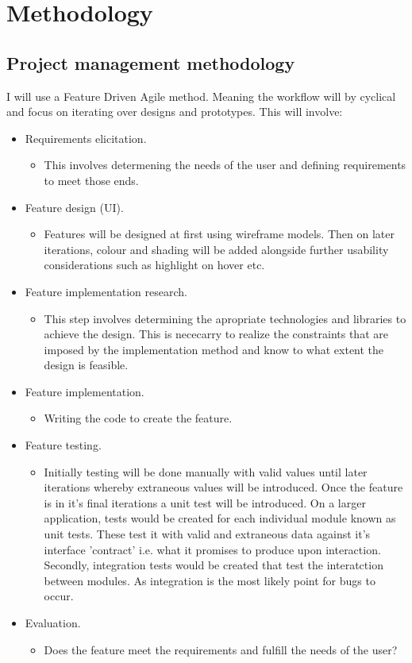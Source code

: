 \chapter{Methodology}
\label{methodology}

\section{Project management methodology}
I will use a Feature Driven Agile method. Meaning the workflow will by cyclical and focus on iterating over designs and prototypes. This will involve:
\begin{itemize}
  \item Requirements elicitation.
  \begin{itemize}
    \item This involves determening the needs of the user and defining requirements to meet those ends.
  \end{itemize}
  \item Feature design (UI).
  \begin{itemize}
    \item Features will be designed at first using wireframe models. Then on later iterations, colour and shading will be added alongside further usability considerations such as highlight on hover etc.
  \end{itemize}
  \item Feature implementation research.
  \begin{itemize}
    \item This step involves determining the apropriate technologies and libraries to achieve the design. This is nececarry to realize the constraints that are imposed by the implementation method and know to what extent the design is feasible.
  \end{itemize}
  \item Feature implementation.
  \begin{itemize}
    \item Writing the code to create the feature.
  \end{itemize}
  \item Feature testing.
  \begin{itemize}
    \item Initially testing will be done manually with valid values until later iterations whereby extraneous values will be introduced. Once the feature is in it's final iterations a unit test will be introduced. On a larger application, tests would be created for each individual module known as unit tests. These test it with valid and extraneous data against it's interface 'contract' i.e. what it promises to produce upon interaction. Secondly, integration tests would be created that test the interatction between modules. As integration is the most likely point for bugs to occur.
  \end{itemize}
  \item Evaluation.
  \begin{itemize}
    \item Does the feature meet the requirements and fulfill the needs of the user?
  \end{itemize}
\end{itemize}
